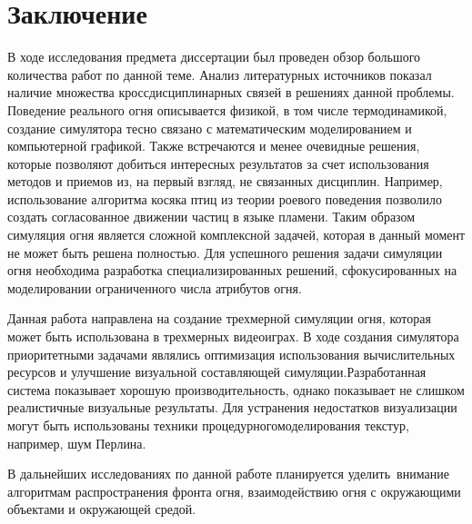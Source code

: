\part*{Заключение}

В ходе исследования предмета диссертации был проведен обзор большого количества
работ по данной теме. Анализ литературных источников показал наличие множества
кроссдисциплинарных связей в решениях данной проблемы. Поведение реального огня
описывается физикой, в том числе термодинамикой, создание симулятора тесно
связано с математическим моделированием и компьютерной графикой. Также
встречаются и менее очевидные решения, которые позволяют добиться интересных
результатов за счет использования методов и приемов из, на первый взгляд, не
связанных дисциплин. Например, использование алгоритма косяка птиц из теории роевого
поведения позволило создать согласованное движении частиц в языке
пламени. Таким образом симуляция огня является
сложной комплексной задачей, которая в данный момент не может быть решена
полностью. Для успешного решения задачи симуляции огня необходима разработка
специализированных решений, сфокусированных на моделировании ограниченного числа
атрибутов огня.

Данная работа направлена на создание трехмерной симуляции огня, которая может
быть использована в трехмерных видеоиграх. В ходе создания симулятора
приоритетными задачами являлись оптимизация использования вычислительных
ресурсов и улучшение визуальной составляющей симуляции.\break{}Разработанная система
показывает хорошую производительность, однако показывает не слишком реалистичные
визуальные результаты. Для устранения недостатков визуализации могут быть
использованы техники процедурного\break{}моделирования текстур, например, шум Перлина.

В дальнейших исследованиях по данной работе планируется уделить~\break{}внимание
алгоритмам распространения фронта огня, взаимодействию огня с окружающими
объектами и окружающей средой.
